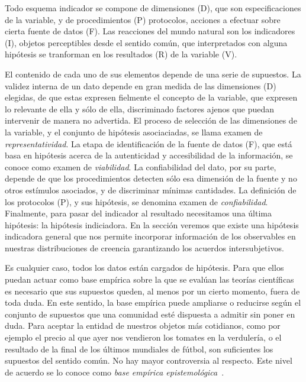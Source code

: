 \documentclass[a4paper,10pt]{book}
\theoremstyle{definition}
\begin{document}
Todo esquema indicador se compone de dimensiones (D), que son especificaciones de la variable, y de procedimientos (P) protocolos, acciones a efectuar sobre cierta fuente de datos (F).
Las reacciones del mundo natural son los indicadores (I), objetos perceptibles desde el sentido común, que interpretados con alguna hipótesis se tranforman en los resultados (R) de la variable (V).


El contenido de cada uno de sus elementos depende de una serie de supuestos.
La validez interna de un dato depende en gran medida de las dimensiones (D) elegidas, de que estas expresen fielmente el concepto de la variable, que expresen lo relevante de ella y sólo de ella, discriminado factores ajenos que puedan intervenir de manera no advertida.
El proceso de selección de las dimensiones de la variable, y el conjunto de hipótesis asociaciadas, se llama examen de \emph{representatividad}.
La etapa de identificación de la fuente de datos (F), que está basa en hipótesis acerca de la autenticidad y accesibilidad de la información, se conoce como examen de \emph{viabilidad}.
La confiabilidad del dato, por su parte, depende de que los procedimientos detecten sólo esa dimensión de la fuente y no otros estímulos asociados, y de discriminar mínimas cantidades.
La definición de los protocolos (P), y sus hipótesis, se denomina examen de \emph{confiabilidad}.
Finalmente, para pasar del indicador al resultado necesitamos una última hipótesis: la hipótesis indiciadora.
En la sección  veremos que existe una hipótesis indicadora general que nos permite incorporar información de los observables en nuestras distribuciones de creencia garantizando los acuerdos intersubjetivos.

Es cualquier caso, todos los datos están cargados de hipótesis.
Para que ellos puedan actuar como base empírica sobre la que se evalúan las teorías científicas es necesario que sus supuestos queden, al menos por un cierto momento, fuera de toda duda.
En este sentido, la base empírica puede ampliarse o reducirse según el conjunto de supuestos que una comunidad esté dispuesta a admitir sin poner en duda.
Para aceptar la entidad de nuestros objetos más cotidianos, como por ejemplo el precio al que ayer nos vendieron los tomates en la verdulería, o el resultado de la final de los últimos mundiales de fútbol, son suficientes los supuestos del sentido común.
No hay mayor controversia al respecto.
Este nivel de acuerdo se lo conoce como \emph{base empírica epistemológica}~\cite{klimovsky1994-desventuras}.%
\end{document}
